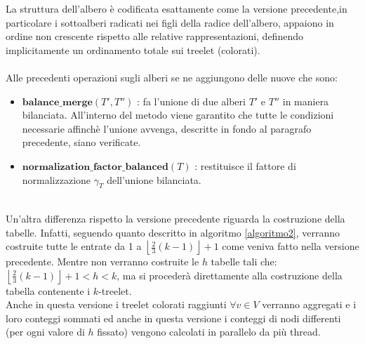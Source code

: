 La struttura dell'albero \`e codificata esattamente come la versione precedente,in particolare i sottoalberi radicati nei figli della radice dell'albero, appaiono in ordine non crescente rispetto alle relative rappresentazioni, definendo implicitamente un ordinamento totale sui treelet (colorati).\\\\
Alle precedenti operazioni sugli alberi se ne aggiungono delle nuove che sono:
\begin{itemize}
	\item $ \textbf{balance\_merge}(T',T'') $ : fa l'unione di due alberi $ T' $ e $ T'' $ in maniera bilanciata.
	All'interno del metodo viene garantito che tutte le condizioni necessarie affinch\`e l'unione avvenga, descritte in fondo al paragrafo precedente, siano verificate.
	\item $ \textbf{normalization\_factor\_balanced}(T) $ : restituisce il fattore di normalizzazione $ \gamma_T $ dell'unione bilanciata.
\end{itemize}\mbox{}\\
Un'altra differenza rispetto la versione precedente riguarda la costruzione della tabelle.
Infatti, seguendo quanto descritto in algoritmo \ref{algoritmo2}, verranno costruite tutte le entrate da 1 a  $ \left\lfloor \frac{2}{3}(k-1) \right\rfloor +1 $ come veniva fatto nella versione precedente.
Mentre non verranno costruite le $ h $ tabelle tali che: $ \left\lfloor \frac{2}{3}(k-1) \right\rfloor +1 < h < k $, ma si proceder\`a direttamente alla costruzione della tabella contenente i $ k $-treelet.\\
Anche in questa versione i treelet colorati raggiunti $ \forall v \in V $ verranno aggregati e i loro conteggi sommati ed anche in questa versione i conteggi di nodi differenti  (per ogni valore di $ h $ fissato) vengono calcolati in parallelo da pi\`u thread.